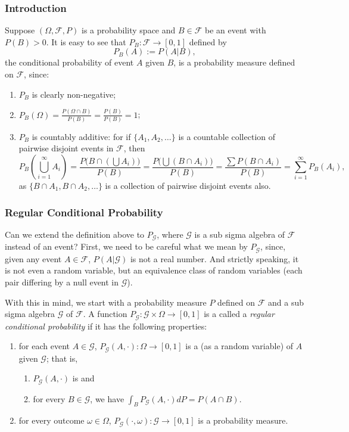 \documentclass[12pt]{article}
\begin{document}
\subsubsection*{Introduction}
Suppose $(\Omega, \mathcal{F}, P)$ is a probability space and $B\in\mathcal{F}$ be an event with $P(B)>0$.  It is easy to see that $P_B:\mathcal{F}\to [0,1]$ defined by $$P_B(A):=P(A |B),$$ the conditional probability of event $A$ given $B$, is a probability measure defined on $\mathcal{F}$, since:
\begin{enumerate}
\item $P_B$ is clearly non-negative;
\item $P_B(\Omega)=\displaystyle{\frac{P(\Omega\cap B)}{P(B)}=\frac{P(B)}{P(B)}=1}$;
\item $P_B$ is countably additive: for if $\lbrace A_1,A_2,\ldots\rbrace$ is a countable collection of pairwise disjoint events in $\mathcal{F}$, then $$P_B(\bigcup_{i=1}^{\infty} A_i)=\frac{P\big(B\cap (\bigcup A_i)\big)}{P(B)} =\frac{P\big(\bigcup (B\cap A_i)\big)}{P(B)} = \frac{\sum P(B\cap A_i)}{P(B)} = \sum_{i=1}^{\infty}P_B(A_i),$$ as $\lbrace B\cap A_1,B\cap A_2,\ldots\rbrace$ is a collection of pairwise disjoint events also.
\end{enumerate}
\subsubsection*{Regular Conditional Probability}
Can we extend the definition above to $P_{\mathcal{G}}$, where $\mathcal{G}$ is a sub sigma algebra of $\mathcal{F}$ instead of an event?  First, we need to be careful what we mean by $P_{\mathcal{G}}$, since, given any event $A\in\mathcal{F}$, $P(A|\mathcal{G})$ is not a real number.  And strictly speaking, it is not even a random variable, but an equivalence class of random variables (each pair differing by a null event in $\mathcal{G}$).

With this in mind, we start with a probability measure $P$ defined on $\mathcal{F}$ and a sub sigma algebra $\mathcal{G}$ of $\mathcal{F}$.  A function $P_{\mathcal{G}}:\mathcal{G}\times\Omega\to [0,1]$ is a called a \emph{regular conditional probability} if it has the following properties:
\begin{enumerate}
\item for each event $A\in\mathcal{G}$, $P_{\mathcal{G}}(A,\cdot):\Omega\to [0,1]$ is a  (as a random variable) of $A$ given $\mathcal{G}$; that is, 
\begin{enumerate}
\item $P_{\mathcal{G}}(A,\cdot)$ is  and 
\item for every $B\in\mathcal{G}$, we have $\displaystyle \int_B P_{\mathcal{G}}(A,\cdot) dP =P(A\cap B).$
\end{enumerate}
\item for every outcome $\omega\in \Omega$, $P_{\mathcal{G}}(\cdot,\omega): \mathcal{G}\to [0,1]$ is a probability measure.
\end{enumerate}
\end{document}
